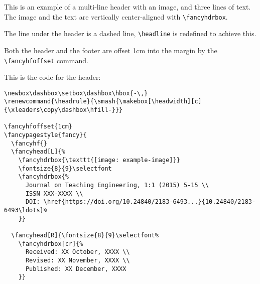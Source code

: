 \documentclass{article}
\renewcommand{\headrule}{\smash{\makebox[\headwidth][c]{\xleaders\copy\dashbox\hfill-}}}
\begin{document}
\pagestyle{fancy}

{\parskip=4pt \parindent=0pt
This is an example of a multi-line header with an image, and three lines of text. The image and the text are vertically center-aligned with \verb|\fancyhdrbox|.

The line under the header is a dashed line, \verb|\headline| is redefined to achieve this.

Both the header and the footer are offset 1cm into the margin by the \verb|\fancyhfoffset| command.}

\bigskip

This is the code for the header:

\begin{verbatim}
\newbox\dashbox\setbox\dashbox\hbox{-\,}
\renewcommand{\headrule}{\smash{\makebox[\headwidth][c]{\xleaders\copy\dashbox\hfill-}}}

\fancyhfoffset{1cm}
\fancypagestyle{fancy}{
  \fancyhf{}
  \fancyhead[L]{%
    \fancyhdrbox{\texttt{[image: example-image]}}
    \fontsize{8}{9}\selectfont
    \fancyhdrbox{%
      Journal on Teaching Engineering, 1:1 (2015) 5-15 \\
      ISSN XXX-XXXX \\
      DOI: \href{https://doi.org/10.24840/2183-6493...}{10.24840/2183-6493\ldots}%
    }}
    
  \fancyhead[R]{\fontsize{8}{9}\selectfont%
    \fancyhdrbox[cr]{%
      Received: XX October, XXXX \\
      Revised: XX November, XXXX \\
      Published: XX December, XXXX
    }}
\end{verbatim}

\bigskip

\kant[1]
\end{document}

